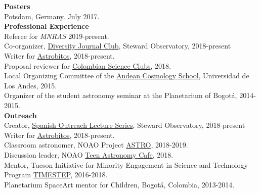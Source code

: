 \documentclass[UTF8]{article}
\begin{document}
{\Large \textbf{Posters}}\\

\indent\indent Potsdam, Germany. July 2017.\\


{\Large {\textbf{Professional Experience}}}\\




\indent\indent Referee for \textit{MNRAS} 2019-present.\\ 
\indent\indent Co-organizer, \href{https://www.as.arizona.edu/diversity_coffee/}{Diversity Journal Club}, Steward Observatory, 2018-present\\
\indent\indent Writer for \href{https://astrobitos.org/}{Astrobitos}, 2018-present.\\ 
\indent\indent Proposal reviewer for \href{https://clubesdeciencia.co/}{Colombian Science Clubs}, 2018.\\
\indent\indent Local Organizing Committee of the \href{http://forero.github.io/AndeanCosmologySchool/}{Andean Cosmology School}, Universidad de Los Andes, 2015.\\
\indent\indent Organizer of the student astronomy seminar at the Planetarium of Bogot\'a, 2014-2015.\\



{\Large \textbf{Outreach}}\\

\indent\indent Creator, \href{https://astrocharlas.github.io/}{Spanish Outreach Lecture Series}, Steward Observatory, 2018-present\\
\indent\indent Writer for \href{https://astrobitos.org/}{Astrobitos}, 2018-present.\\ 
\indent\indent Classroom astronomer, NOAO Project \href{https://www.noao.edu/education/astro/}{ASTRO}, 2018-2019.\\
\indent\indent Discussion leader, NOAO \href{http://www.teenastronomycafe.org/}{Teen Astronomy Cafe}, 2018.\\
\indent\indent Mentor, Tucson Initiative for Minority Engagement in Science and Technology Program \href{https://lavinia.as.arizona.edu/~timestep/}{TIMESTEP}, 2016-2018.\\
\indent\indent Planetarium SpaceArt mentor for Children, Bogot\'a, Colombia, 2013-2014.\\
\end{document}
